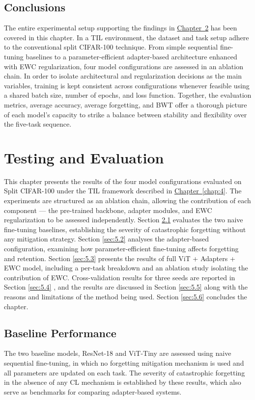 \documentclass[english, LaM, oneside]{sapthesis}%
\numberwithin{equation}{chapter}
\begin{document}
\section{Conclusions}
\label{sec:4.7}
The entire experimental setup supporting the findings in \hyperref[chap:5]{Chapter~\ref*{chap:5}} has been covered in this chapter. In a TIL environment, the dataset and task setup adhere to the conventional split CIFAR-100 technique. From simple sequential fine-tuning baselines to a parameter-efficient adapter-based architecture enhanced with EWC regularization, four model configurations are assessed in an ablation chain. In order to isolate architectural and regularization decisions as the main variables, training is kept consistent across configurations whenever feasible using a shared batch size, number of epochs, and loss function. Together, the evaluation metrics, average accuracy, average forgetting, and BWT offer a thorough picture of each model's capacity to strike a balance between stability and flexibility over the five-task sequence.

\chapter{Testing and Evaluation}
\label{chap:5}
This chapter presents the results of the four model configurations evaluated on Split CIFAR-100 under the TIL framework described in \hyperref[chap:4]{Chapter~\ref*{chap:4}}. The experiments are structured as an ablation chain, allowing the contribution of each component — the pre-trained backbone, adapter modules, and EWC regularization to be assessed independently. Section \ref{sec:5.1} evaluates the two naive fine-tuning baselines, establishing the severity of catastrophic forgetting without any mitigation strategy. Section \ref{sec:5.2}  analyses the adapter-based configuration, examining how parameter-efficient fine-tuning affects forgetting and retention. Section \ref{sec:5.3} presents the results of full ViT + Adapters + EWC model, including a per-task breakdown and an ablation study isolating the contribution of EWC. Cross-validation results for three seeds are reported in Section \ref{sec:5.4} , and the results are discussed in Section \ref{sec:5.5} along with the reasons and limitations of the method being used. Section \ref{sec:5.6} concludes the chapter.

\section{Baseline Performance}
\label{sec:5.1}
The two baseline models, ResNet-18 and ViT-Tiny are assessed using naive sequential fine-tuning, in which no forgetting mitigation mechanism is used and all parameters are updated on each task. The severity of catastrophic forgetting in the absence of any CL mechanism is established by these results, which also serve as benchmarks for comparing adapter-based systems.
\end{document}
